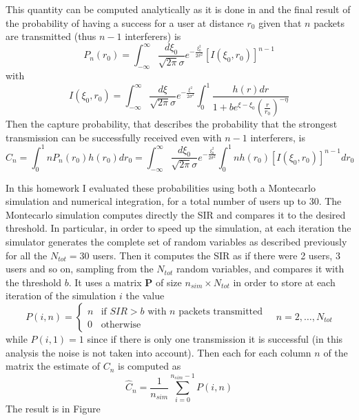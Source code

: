 \documentclass[10pt]{article}
\begin{document}
This quantity can be computed analytically as it is done in \cite{capture} and the final result of the probability of having a success for a user at distance $r_0$ given that $n$ packets are transmitted (thus $n-1$ interferers) is
\begin{equation}
  P_n(r_0) = \int_{-\infty}^{\infty} \frac{d\xi_0}{\sqrt{2\pi}\sigma} e^{-\frac{\xi_0^2}{2\sigma^2}}[I(\xi_0, r_0)]^{n-1}
\end{equation}
with 
\begin{equation}
  I(\xi_0, r_0) = \int_{-\infty}^{\infty} \frac{d\xi}{\sqrt{2\pi}\sigma}e^{-\frac{\xi^2}{2\sigma^2}} \int_{0}^{1} \frac{h(r) dr}{1+be^{\xi - \xi_0}\left(\frac{r}{r_0}\right)^{-\eta}}
  \label{eq:I}
\end{equation}
Then the capture probability, that describes the probability that the strongest transmission can be successfully received even with $n-1$ interferers, is
\begin{equation}
  C_n = \int_0^1 nP_n(r_0)h(r_0) dr_0 = \int_{-\infty}^{\infty} \frac{d\xi_0}{\sqrt{2\pi}\sigma} e^{-\frac{\xi_0^2}{2\sigma^2}} \int_0^1 n h(r_0) [I(\xi_0, r_0)]^{n-1} dr_0
  \label{eq:cn}
\end{equation}

In this homework I evaluated these probabilities using both a Montecarlo simulation and numerical integration, for a total number of users up to 30. The Montecarlo simulation computes directly the SIR and compares it to the desired threshold. In particular, in order to speed up the simulation, at each iteration the simulator generates the complete set of random variables as described previously for all the $N_{tot} = 30$ users. Then it computes the SIR as if there were 2 users, 3 users and so on, sampling from the $N_{tot}$ random variables, and compares it with the threshold $b$. It uses a matrix $\mathbf{P}$ of size $n_{sim} \times N_{tot}$ in order to store at each iteration of the simulation $i$ the value
\begin{equation}
P(i, n) = 
\begin{cases}
  n & \mbox{if } SIR > b \mbox{ with } n \mbox{ packets transmitted}\\
  0 & \mbox{otherwise}
\end{cases}
 \quad n = 2, \dots, N_{tot}
\end{equation}
while $P(i, 1) = 1$ since if there is only one transmission it is successful (in this analysis the noise is not taken into account).
Then each for each column $n$ of the matrix the estimate of $C_n$ is computed as
\begin{equation}
  \hat{C}_n = \frac{1}{n_{sim}} \sum_{i = 0}^{n_{sim} - 1} P(i, n)
\end{equation}
The result is in Figure
\end{document}
